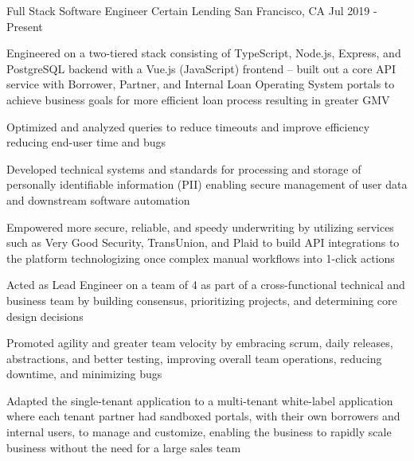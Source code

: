 






\begin{cventries}

  \cventry
     {Full Stack Software Engineer}
     {Certain Lending}
     {San Francisco, CA}
     {Jul 2019 - Present}
     {
       \begin{cvitems}
			\item{Engineered on a two-tiered stack consisting of TypeScript, Node.js, Express, and PostgreSQL backend with a Vue.js (JavaScript) frontend -- built out a core API service with Borrower, Partner, and Internal Loan Operating System portals to achieve business goals for more efficient loan process resulting in greater GMV}
			\item{Optimized and analyzed queries to reduce timeouts and improve efficiency reducing end-user time and bugs}
			\item{Developed technical systems and standards for processing and storage of personally identifiable information (PII) enabling secure management of user data and downstream software automation}
			\item{Empowered more secure, reliable, and speedy underwriting by utilizing services such as Very Good Security, TransUnion, and Plaid to build API integrations to the platform technologizing once complex manual workflows into 1-click actions}
   		\item{Acted as Lead Engineer on a team of 4 as part of a cross-functional technical and business team by building consensus, prioritizing projects, and determining core design decisions}
  		\item{Promoted agility and greater team velocity by embracing scrum, daily releases, abstractions, and better testing, improving overall team operations, reducing downtime, and minimizing bugs}
   		\item{Adapted the single-tenant application to a multi-tenant white-label application where each tenant partner had sandboxed portals, with their own borrowers and internal users, to manage and customize, enabling the business to rapidly scale business without the need for a large sales team}

\end{cvitems}}
\end{cventries}
